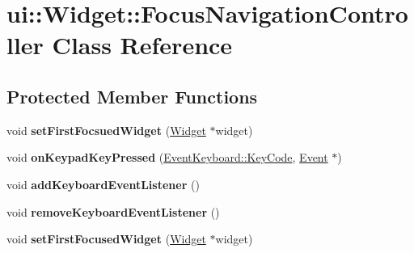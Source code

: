 \hypertarget{classui_1_1Widget_1_1FocusNavigationController}{}\section{ui\+:\+:Widget\+:\+:Focus\+Navigation\+Controller Class Reference}
\label{classui_1_1Widget_1_1FocusNavigationController}
\subsection*{Protected Member Functions}
\begin{DoxyCompactItemize}
\item 
\mbox{\label{classui_1_1Widget_1_1FocusNavigationController_a6f0b9bb86a1fe2dabde255bc9291fc6b}} 
void {\bfseries set\+First\+Focsued\+Widget} (\hyperlink{classui_1_1Widget}{Widget} $\ast$widget)
\item 
\mbox{\label{classui_1_1Widget_1_1FocusNavigationController_aef5b6ab386b5fe8ec3346a313ad5b1c0}} 
void {\bfseries on\+Keypad\+Key\+Pressed} (\hyperlink{classEventKeyboard_a7cd3fa46515673276ce8ec7f0e051606}{Event\+Keyboard\+::\+Key\+Code}, \hyperlink{classEvent}{Event} $\ast$)
\item 
\mbox{\label{classui_1_1Widget_1_1FocusNavigationController_ae28e517cba30738905d09a629245dc6d}} 
void {\bfseries add\+Keyboard\+Event\+Listener} ()
\item 
\mbox{\label{classui_1_1Widget_1_1FocusNavigationController_ae9bcce4e64aec757c529fddc302dcb02}} 
void {\bfseries remove\+Keyboard\+Event\+Listener} ()
\item 
\mbox{\label{classui_1_1Widget_1_1FocusNavigationController_af783fe8adc3526e182611a9048f4b3d4}} 
void {\bfseries set\+First\+Focused\+Widget} (\hyperlink{classui_1_1Widget}{Widget} $\ast$widget)
\item 
\mbox{\label{classui_1_1Widget_1_1FocusNavigationController_aef5b6ab386b5fe8ec3346a313ad5b1c0}} 

\end{DoxyCompactItemize}
